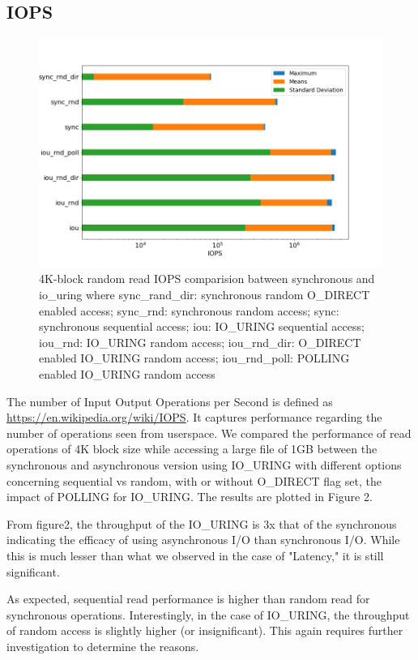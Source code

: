 \documentclass{article}
\begin{document}
\subsection{IOPS}
\begin{figure}
    \centering
    \includegraphics[scale = 0.3]{iops.png}
    \caption{4K-block random read IOPS comparision batween synchronous 
    and io\_uring where
    sync\_rand\_dir: synchronous random O\_DIRECT enabled access;
    sync\_rnd: synchronous random access;
    sync: synchronous sequential access;
    iou: IO\_URING sequential access;
    iou\_rnd: IO\_URING random access;
    iou\_rnd\_dir: O\_DIRECT enabled IO\_URING random access;
    iou\_rnd\_poll: POLLING enabled IO\_URING random access
    }
    \label{Figure2}
\end{figure}
The number of Input Output Operations per Second is defined as 
\href{IOPS}{https://en.wikipedia.org/wiki/IOPS}. 
It captures performance regarding the number of operations 
seen from userspace. We compared the performance of read operations of 4K block size while accessing a 
large file of 1GB between the 
synchronous and asynchronous version using IO\_URING with different options concerning sequential vs random, with or without 
O\_DIRECT flag set, the impact of POLLING for IO\_URING. The results are plotted in Figure 2.

From figure2, the throughput of the IO\_URING is 3x that of the synchronous indicating the efficacy of using asynchronous I/O than 
synchronous I/O. While this is much lesser than what we observed in the case of "Latency," it is still significant. 

As expected, sequential read performance is higher than random read for synchronous operations. Interestingly, in the case of 
IO\_URING, the throughput of random access is slightly higher (or insignificant). This again requires further investigation to 
determine the reasons.
\end{document}

